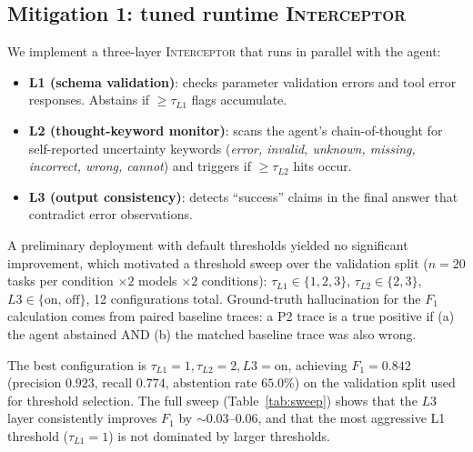 \documentclass[11pt]{article}
\newcommand{\interceptor}{\textsc{Interceptor}}
\begin{document}


\subsection{Mitigation 1: tuned runtime \interceptor{}}
\label{sec:mitigate}

We implement a three-layer \interceptor{} that runs in parallel with the agent:
\begin{itemize}
  \item \textbf{L1 (schema validation)}: checks parameter validation errors and tool error responses. Abstains if $\geq\!\tau_{L1}$ flags accumulate.
  \item \textbf{L2 (thought-keyword monitor)}: scans the agent's chain-of-thought for self-reported uncertainty keywords (\emph{error, invalid, unknown, missing, incorrect, wrong, cannot}) and triggers if $\geq\!\tau_{L2}$ hits occur.
  \item \textbf{L3 (output consistency)}: detects ``success'' claims in the final answer that contradict error observations.
\end{itemize}

A preliminary deployment with default thresholds yielded no significant improvement, which motivated a threshold sweep over the validation split ($n\!=\!20$ tasks per condition $\times\!2$ models $\times\!2$ conditions): $\tau_{L1} \in \{1,2,3\}$, $\tau_{L2} \in \{2,3\}$, $L3 \in \{\text{on, off}\}$, 12 configurations total. Ground-truth hallucination for the $F_1$ calculation comes from paired baseline traces: a P2 trace is a true positive if (a) the agent abstained AND (b) the matched baseline trace was also wrong.

The best configuration is $\tau_{L1}\!=\!1, \tau_{L2}\!=\!2, L3\!=\!\text{on}$, achieving $F_1\!=\!0.842$ (precision $0.923$, recall $0.774$, abstention rate $65.0\%$) on the validation split used for threshold selection. The full sweep (Table~\ref{tab:sweep}) shows that the $L3$ layer consistently improves $F_1$ by $\sim\!0.03$--$0.06$, and that the most aggressive L1 threshold ($\tau_{L1}\!=\!1$) is not dominated by larger thresholds.
\end{document}
